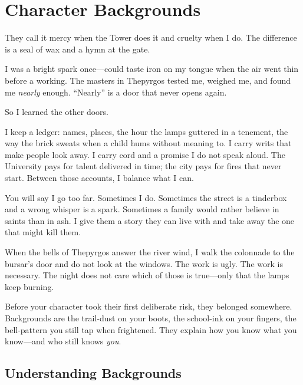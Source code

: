 \chapter{Character Backgrounds}
\label{ch:backgrounds}

\begin{tcolorbox}[colback=black!3!white,colframe=black!60!white,title={From the journal of a Thepyrgosi Witch Hunter},fonttitle=\bfseries]
They call it mercy when the Tower does it and cruelty when I do. The difference is a seal of wax and a hymn at the gate.

I was a bright spark once—could taste iron on my tongue when the air went thin before a working. The masters in Thepyrgos tested me, weighed me, and found me \emph{nearly} enough. ``Nearly'' is a door that never opens again.

So I learned the other doors.

I keep a ledger: names, places, the hour the lamps guttered in a tenement, the way the brick sweats when a child hums without meaning to. I carry writs that make people look away. I carry cord and a promise I do not speak aloud. The University pays for talent delivered in time; the city pays for fires that never start. Between those accounts, I balance what I can.

You will say I go too far. Sometimes I do. Sometimes the street is a tinderbox and a wrong whisper is a spark. Sometimes a family would rather believe in saints than in ash. I give them a story they can live with and take away the one that might kill them.

When the bells of Thepyrgos answer the river wind, I walk the colonnade to the bursar's door and do not look at the windows. The work is ugly. The work is necessary. The night does not care which of those is true—only that the lamps keep burning.
\end{tcolorbox}

Before your character took their first deliberate risk, they belonged somewhere. Backgrounds are the trail-dust on your boots, the school-ink on your fingers, the bell-pattern you still tap when frightened. They explain how you know what you know—and who still knows \emph{you}.

\section{Understanding Backgrounds}


